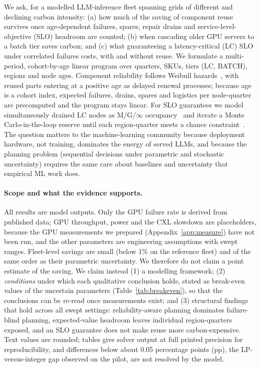\documentclass{article} %
\begin{document}
We ask, for a modelled LLM-inference fleet spanning grids of different and declining carbon intensity: (a) how much of the saving of component reuse survives once age-dependent failures, spares, repair drains and service-level-objective (SLO) headroom are counted; (b) when cascading older GPU servers to a batch tier saves carbon; and (c) what guaranteeing a latency-critical (LC) SLO under correlated failures costs, with and without reuse. We formulate a multi-period, cohort-by-age linear program over quarters, SKUs, tiers (LC, BATCH), regions and node ages. Component reliability follows Weibull hazards~\citep{Weibull1951StatisticalDistribution}, with reused parts entering at a positive age as delayed renewal processes; because age is a cohort index, expected failures, drains, spares and logistics per node-quarter are precomputed and the program stays linear. For SLO guarantees we model simultaneously drained LC nodes as M/G/$\infty$ occupancy~\citep{Eick1993PhysicsMtg} and iterate a Monte Carlo-in-the-loop reserve until each region-quarter meets a chance constraint~\citep{Cohen2017OvercommitmentCloud}. The question matters to the machine-learning community because deployment hardware, not training, dominates the energy of served LLMs, and because the planning problem (sequential decisions under parametric and stochastic uncertainty) requires the same care about baselines and uncertainty that empirical ML work does.

\paragraph{Scope and what the evidence supports.} All results are model outputs. Only the GPU failure rate is derived from published data; GPU throughput, power and the CXL slowdown are placeholders, because the GPU measurements we prepared (Appendix~\ref{app:measure}) have not been run, and the other parameters are engineering assumptions with swept ranges. Fleet-level savings are small (below 1\% on the reference fleet) and of the same order as their parametric uncertainty. We therefore do not claim a point estimate of the saving. We claim instead (1) a modelling framework; (2) \emph{conditions} under which each qualitative conclusion holds, stated as break-even values of the uncertain parameters (Table~\ref{tab:breakeven}), so that the conclusions can be re-read once measurements exist; and (3) structural findings that hold across all swept settings: reliability-aware planning dominates failure-blind planning, expected-value headroom leaves individual region-quarters exposed, and an SLO guarantee does not make reuse more carbon-expensive. Text values are rounded; tables give solver output at full printed precision for reproducibility, and differences below about 0.05 percentage points (pp), the LP-versus-integer gap observed on the pilot, are not resolved by the model.
\end{document}
